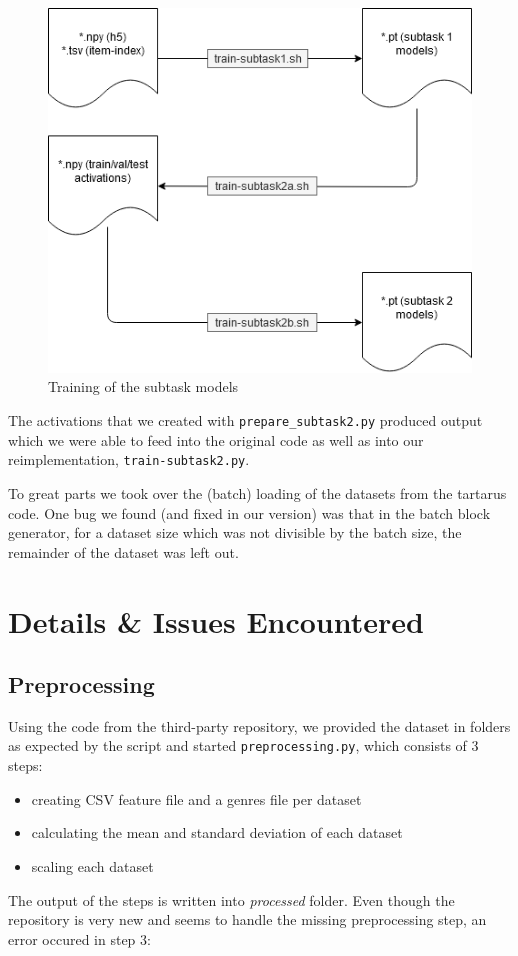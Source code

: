 \documentclass[sigconf,nonacm]{acmart}
\begin{document}
\begin{figure}
  \includegraphics[width=\linewidth]{subtasks.png}
  \caption{Training of the subtask models}
  \label{fig:subtasks}
\end{figure}

The activations that we created with \texttt{prepare\_subtask2.py}
produced output which we were able to feed into the
original code as well as into our reimplementation, \texttt{train-subtask2.py}.

To great parts we took over the (batch) loading of the datasets from the tartarus code.
One bug we found (and fixed in our version) was that in the batch block generator, for a dataset size 
which was not divisible by the batch size, the remainder of the dataset was left out.

\section{Details \& Issues Encountered}

\subsection{Preprocessing}

Using the code from the third-party repository,
we provided the dataset in folders as expected by the script
and started \texttt{preprocessing.py},
which consists of 3 steps:
\begin{itemize}
  \item creating CSV feature file and a genres file per dataset
  \item calculating the mean and standard deviation of each dataset
  \item scaling each dataset
\end{itemize}
The output of the steps is written into \textit{processed} folder.
Even though the repository is very new and seems to handle the missing preprocessing step, an error occured in step 3:
\end{document}
